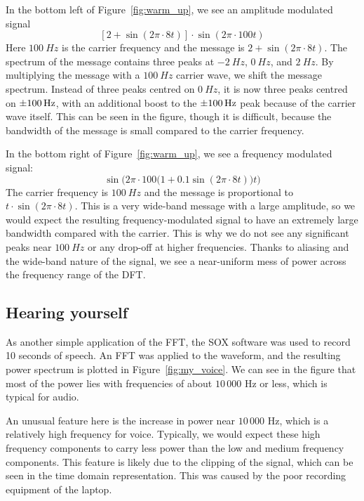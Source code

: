 \documentclass[twocolumn]{myarticle}
\begin{document}
In the bottom left of Figure~\ref{fig:warm_up}, we see an amplitude modulated signal
\[
    \left[ 2 + \sin(2\pi \cdot 8 t) \right] \cdot \sin ( 2 \pi \cdot 100 t)
\]
Here $ \SI{100}{Hz} $ is the carrier frequency and the message is $ 2 + \sin(2 \pi \cdot 8 t) $.
The spectrum of the message contains three peaks at $ \SI{-2}{Hz} $, $ \SI{0}{Hz} $, and $ \SI{2}{Hz} $.
By multiplying the message with a $ \SI{100}{Hz} $ carrier wave, we shift the message spectrum.
Instead of three peaks centred on $ \SI{0}{Hz} $, it is now three peaks centred on $ \SI{+-100}{Hz} $, with an additional boost to the $ \SI{+-100}{Hz} $ peak because of the carrier wave itself.
This can be seen in the figure, though it is difficult, because the bandwidth of the message is small compared to the carrier frequency.

In the bottom right of Figure~\ref{fig:warm_up}, we see a frequency modulated signal:
\[
    \sin \Big( 2 \pi \cdot 100 \big( 1 + 0.1 \sin (2 \pi \cdot 8 t) \big) t \Big)
\]
The carrier frequency is $ \SI{100}{Hz} $ and the message is proportional to $ t \cdot \sin(2 \pi \cdot 8 t) $.
This is a very wide-band message with a large amplitude, so we would expect the resulting frequency-modulated signal to have an extremely large bandwidth compared with the carrier.
This is why we do not see any significant peaks near $ \SI{100}{Hz} $ or any drop-off at higher frequencies.
Thanks to aliasing and the wide-band nature of the signal, we see a near-uniform mess of power across the frequency range of the DFT.

\subsection{Hearing yourself}
\label{subsec:hearing_yourself}

As another simple application of the FFT, the SOX software was used to record 10 seconds of speech.
An FFT was applied to the waveform, and the resulting power spectrum is plotted in Figure~\ref{fig:my_voice}.
We can see in the figure that most of the power lies with frequencies of about $ 10\,000 $ Hz or less, which is typical for audio.

An unusual feature here is the increase in power near $ 10\,000 $ Hz, which is a relatively high frequency for voice.
Typically, we would expect these high frequency components to carry less power than the low and medium frequency components.
This feature is likely due to the clipping of the signal, which can be seen in the time domain representation.
This was caused by the poor recording equipment of the laptop.
\end{document}

